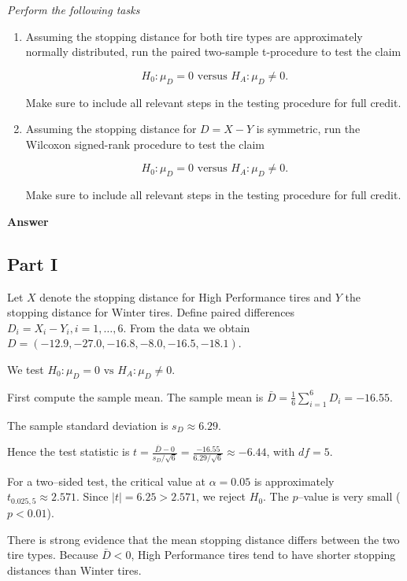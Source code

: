 \documentclass[letterpaper]{article}
\begin{document}
	\medskip
	
	\emph{Perform the following tasks}
	
	\begin{enumerate}
		
		\item[i] Assuming the stopping distance for both tire types are approximately normally distributed, run the paired two-sample t-procedure to test the claim
		
		\[
		H_0 : \mu_D = 0 
		\text{ versus } 
		H_A : \mu_D \neq 0 .
		\]
		
		Make sure to include all relevant steps in the testing procedure for full credit.
		
		\item[ii] Assuming the stopping distance for $D = X - Y$ is symmetric, run the Wilcoxon signed-rank procedure to test the claim
		
		\[
		H_0 : \mu_D = 0 
		\text{ versus } 
		H_A : \mu_D \neq 0 .
		\]
		
		Make sure to include all relevant steps in the testing procedure for full credit.
		
	\end{enumerate}
	
	
	\textbf{Answer}
	
	
	
	
	\subsection{Part I}
	Let $X$ denote the stopping distance for High Performance tires and $Y$ the stopping distance for Winter tires. Define paired differences
	$
	D_i = X_i - Y_i,  i=1,\dots,6.
	$
	From the data we obtain
	$
	D = (-12.9,-27.0,-16.8,-8.0,-16.5,-18.1).
	$
	
	We test
	$
	H_0:\mu_D=0
	\text{ vs } 
	H_A:\mu_D\ne 0.
	$ 
	
	First compute the sample mean. The sample mean is
	$\bar D=\frac{1}{6}\sum_{i=1}^6 D_i=-16.55$.
	
	The sample standard deviation is
	$s_D\approx 6.29$.
	
	Hence the test statistic is
	$t=\frac{\bar D-0}{s_D/\sqrt{6}}
	=\frac{-16.55}{6.29/\sqrt{6}}
	\approx -6.44$,
	with $df=5$.
	
	For a two–sided test, the critical value at $\alpha=0.05$ is approximately
	$
	t_{0.025,5}\approx 2.571.$ Since $|t|=6.25>2.571$, we reject $H_0$. The $p$–value is very small ($p<0.01$).
	
	There is strong evidence that the mean stopping distance differs between the two tire types. Because $\bar D<0$, High Performance tires tend to have shorter stopping distances than Winter tires.
	
\end{document}
